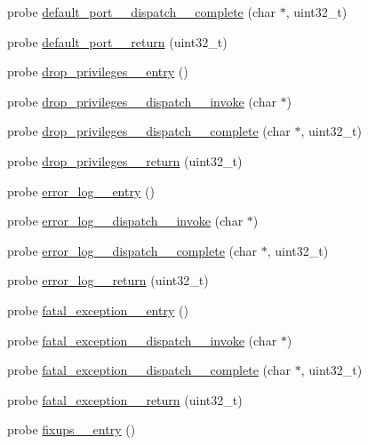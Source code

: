 \begin{DoxyCompactItemize}
\item 
probe \hyperlink{apache__probes_8d_adb1a474410619b734d5e058b91a552ad}{default\+\_\+port\+\_\+\+\_\+dispatch\+\_\+\+\_\+complete} (char $\ast$, uint32\+\_\+t)
\item 
probe \hyperlink{apache__probes_8d_a16cc36ec734a25ac6c4ca11cff69a660}{default\+\_\+port\+\_\+\+\_\+return} (uint32\+\_\+t)
\item 
probe \hyperlink{apache__probes_8d_aaa7f9855c3073483af9cb44a2b403609}{drop\+\_\+privileges\+\_\+\+\_\+entry} ()
\item 
probe \hyperlink{apache__probes_8d_aad53ae5fab08a97b2bf1da07a0447be8}{drop\+\_\+privileges\+\_\+\+\_\+dispatch\+\_\+\+\_\+invoke} (char $\ast$)
\item 
probe \hyperlink{apache__probes_8d_af6c37f2315fad478a3478001ed2eceaf}{drop\+\_\+privileges\+\_\+\+\_\+dispatch\+\_\+\+\_\+complete} (char $\ast$, uint32\+\_\+t)
\item 
probe \hyperlink{apache__probes_8d_a3f04cb543aa1a5462998c4a74ab190e2}{drop\+\_\+privileges\+\_\+\+\_\+return} (uint32\+\_\+t)
\item 
probe \hyperlink{apache__probes_8d_a2dbeee04cacde78b90117948ab011c78}{error\+\_\+log\+\_\+\+\_\+entry} ()
\item 
probe \hyperlink{apache__probes_8d_ad51a34e7e05258f0b6e029bb0f4249ba}{error\+\_\+log\+\_\+\+\_\+dispatch\+\_\+\+\_\+invoke} (char $\ast$)
\item 
probe \hyperlink{apache__probes_8d_a32d2c8347e88b6a9903d98ddf51bc511}{error\+\_\+log\+\_\+\+\_\+dispatch\+\_\+\+\_\+complete} (char $\ast$, uint32\+\_\+t)
\item 
probe \hyperlink{apache__probes_8d_a8bed2ba64870e06d1db3b5b03308c3fa}{error\+\_\+log\+\_\+\+\_\+return} (uint32\+\_\+t)
\item 
probe \hyperlink{apache__probes_8d_a765ada4c55a079ff6ccbd1b7c05bef4b}{fatal\+\_\+exception\+\_\+\+\_\+entry} ()
\item 
probe \hyperlink{apache__probes_8d_ac7908cccdf9b0a6c8aa87233b7be7c1e}{fatal\+\_\+exception\+\_\+\+\_\+dispatch\+\_\+\+\_\+invoke} (char $\ast$)
\item 
probe \hyperlink{apache__probes_8d_a9dff781b2cf54f4154c130f94c3f0780}{fatal\+\_\+exception\+\_\+\+\_\+dispatch\+\_\+\+\_\+complete} (char $\ast$, uint32\+\_\+t)
\item 
probe \hyperlink{apache__probes_8d_ae0b625365f5aaac5bcdbaf4349243da4}{fatal\+\_\+exception\+\_\+\+\_\+return} (uint32\+\_\+t)
\item 
probe \hyperlink{apache__probes_8d_a59675156b328c1960bf5fbf8ea1932c5}{fixups\+\_\+\+\_\+entry} ()

\end{DoxyCompactItemize}
